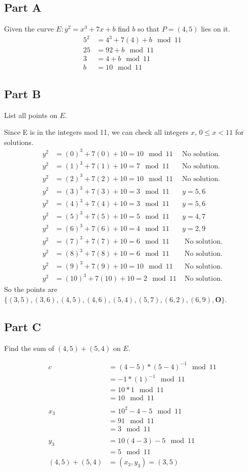 \documentclass[12pt,letterpaper]{article}
\begin{document}
\subsection{Part A}
\label{sec-3-1}
Given the curve $E: y^2 = x^3 + 7x + b$ find $b$ so that $P = (4,
   5)$ lies on it.
\begin{align*}
5^2 &= 4^3 + 7(4) + b \mod 11 \\
25 &= 92 + b \mod 11 \\
3 &= 4 + b \mod 11 \\
b &= 10 \mod 11
\end{align*}
\subsection{Part B}
\label{sec-3-2}
List all points on $E$.

Since E is in the integers mod 11, we can check all integers $x$, $0
   \leq x < 11$ for solutions.
\begin{align*}
y^2 &= (0)^3 + 7(0) + 10 = 10 \mod 11 & \text{No solution.} \\
y^2 &= (1)^3 + 7(1) + 10 = 7 \mod 11 & \text{No solution.} \\
y^2 &= (2)^3 + 7(2) + 10 = 10 \mod 11 & \text{No solution.} \\
y^2 &= (3)^3 + 7(3) + 10 = 3 \mod 11 & y=5,6 \\
y^2 &= (4)^3 + 7(4) + 10 = 3 \mod 11 & y=5,6 \\
y^2 &= (5)^3 + 7(5) + 10 = 5 \mod 11 & y=4,7 \\
y^2 &= (6)^3 + 7(6) + 10 = 4 \mod 11 & y=2,9 \\
y^2 &= (7)^3 + 7(7) + 10 = 6 \mod 11 & \text{ No solution.} \\
y^2 &= (8)^3 + 7(8) + 10 = 6 \mod 11 & \text{ No solution.} \\
y^2 &= (9)^3 + 7(9) + 10 = 10 \mod 11 & \text{ No solution.} \\
y^2 &= (10)^3 + 7(10) + 10 = 2 \mod 11 & \text{ No solution.}
\end{align*}
So the points are $\{
   (3,5),(3,6),(4,5),(4,6),(5,4),(5,7),(6,2),(6,9), \textbf{O} \}$.
\subsection{Part C}
\label{sec-3-3}
Find the sum of $(4,5)+(5,4)$ on $E$.

\begin{align*}
c &= (4 - 5) * (5 - 4)^{-1} \mod 11 \\
&= -1 * (1)^{-1} \mod 11 \\
&= 10 * 1 \mod 11 \\
&= 10 \mod 11 \\
\\
x_3 &= 10^2 - 4 - 5 \mod 11 \\
&= 91 \mod 11 \\
&= 3 \mod 11 \\
\\
y_3 &= 10(4 - 3) - 5 \mod 11 \\
&= 5 \mod 11
\\
(4,5) + (5,4) &= (x_3, y_3) = (3, 5) \\
\end{align*}
\end{document}
